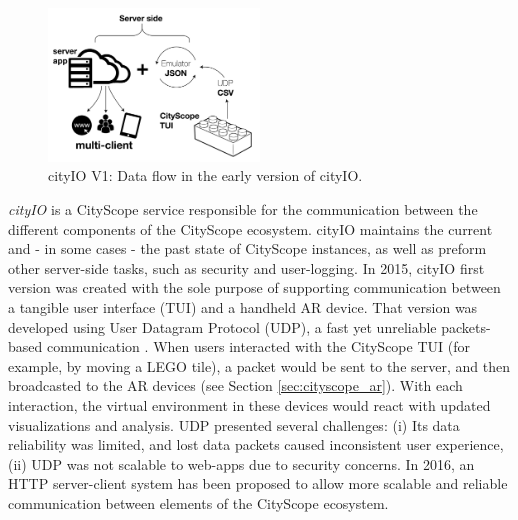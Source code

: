 {{      \begin{figure}[!htb]
          \begin{center}
              \includegraphics[width=0.5\textwidth]{chapters/transformation/cs_arch/figures/arch/cs_arch2.png}
          \end{center}
          \caption{cityIO V1: Data flow in the early version of cityIO.}
          \label{fig:cityio_v1}
      \end{figure}


      \textit{cityIO} is a CityScope service responsible for the communication between the different components of the CityScope ecosystem. cityIO maintains the current and - in some cases - the past state of CityScope instances, as well as preform other server-side tasks, such as security and user-logging. In 2015, cityIO first version was created with the sole purpose of supporting communication between a tangible user interface (TUI) and a handheld AR device. That version was developed using User Datagram Protocol (UDP), a fast yet unreliable packets-based communication \cite{richard1994tcp}. When users interacted with the CityScope TUI (for example, by moving a LEGO tile), a packet would be sent to the server, and then broadcasted to the AR devices (see Section \eqref{sec:cityscope_ar}). With each interaction, the virtual environment in these devices would react with updated visualizations and analysis. UDP presented several challenges: (i) Its data reliability was limited, and lost data packets caused inconsistent user experience, (ii) UDP was not scalable to web-apps due to security concerns. In 2016, an HTTP server-client system has been proposed to allow more scalable and reliable communication between elements of the CityScope ecosystem.

}}
